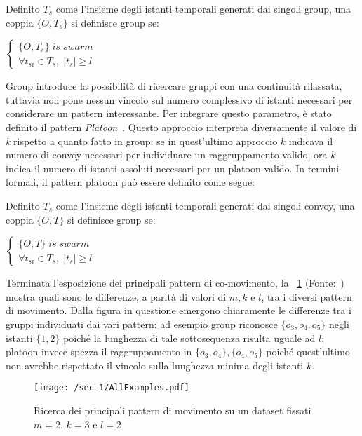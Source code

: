 \begin{definition}[Group]\label{definition:group}
  Definito \(T_{s}\) come l'insieme degli istanti temporali generati dai singoli group,
  una coppia \( \{ O, T_{s} \} \) si definisce group se:
  \begin{center}
    \(
      \begin{cases}
         \{ O, T_{s} \} \; is \; swarm   \\
      \forall t_{si} \in T_{s}, \; |t_{s}| \geq l
      \end{cases}
    \)

  \end{center}
\end{definition}

Group introduce la possibilità di ricercare gruppi con una continuità rilassata, tuttavia
non pone nessun vincolo sul numero complessivo di istanti necessari per considerare
un pattern interessante.
Per integrare questo parametro, è stato definito il pattern \textit{Platoon}~\cite{li2015efficient}.
Questo approccio interpreta diversamente il valore di \textit{k} rispetto a quanto fatto in
group: se in quest'ultimo approccio \(k\) indicava il numero di convoy necessari per individuare
un raggruppamento valido, ora \(k\) indica il numero di istanti assoluti necessari per
un platoon valido.
In termini formali, il pattern platoon può essere definito come segue:

\begin{definition}[Platoon]\label{definition:platoon}
  Definito \(T_{s}\) come l'insieme degli istanti temporali generati dai singoli convoy,
  una coppia \( \{ O, T \} \) si definisce group se:
  \begin{center}
    \(
      \begin{cases}
         \{ O, T \} \; is \; swarm   \\
      \forall t_{si} \in T_{s}, \; |t_{s}| \geq l
      \end{cases}
    \)

  \end{center}
\end{definition}

Terminata l'esposizione dei principali pattern di co-movimento, la
~\cref{fig:chap-1:AllExample} (Fonte:~\cite{DBLP:journals/pvldb/FanZWT16}) mostra
quali sono le differenze, a parità di valori di \(m, k \) e \(l\), tra i diversi pattern di movimento.
Dalla figura in questione emergono chiaramente le differenze tra i gruppi individuati dai
vari pattern: ad esempio group riconosce \( \{ o_{3}, o_{4}, o_{5}\} \) negli istanti \( \{ 1, 2 \} \)
poiché la lunghezza di tale sottosequenza risulta uguale ad \(l\); platoon invece spezza
il raggruppamento in \( \{ o_{3}, o_{4} \}, \{ o_{4}, o_{5} \} \) poiché quest'ultimo non
avrebbe rispettato il vincolo sulla lunghezza minima degli istanti \(k\).

\begin{figure}
  \centering
  \texttt{[image: /sec-1/AllExamples.pdf]}
  \caption{Ricerca dei principali pattern di movimento su un dataset fissati \(m=2\), \(k=3\) e \(l=2\)}%
  \label{fig:chap-1:AllExample}
\end{figure}
